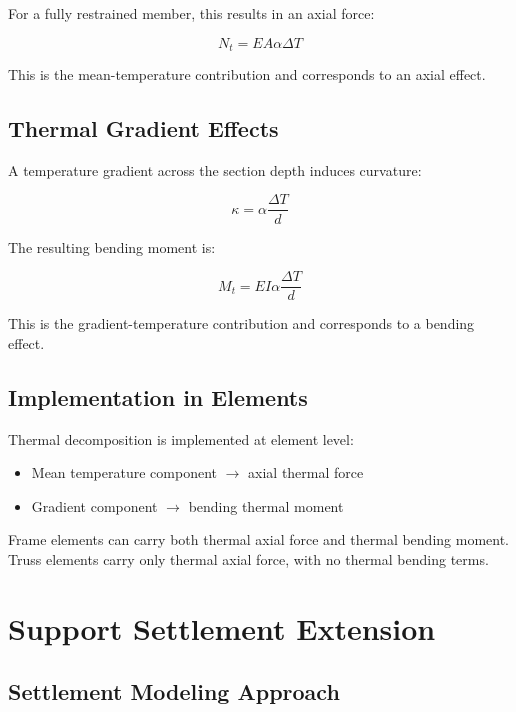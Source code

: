 For a fully restrained member, this results in an axial force:

\begin{equation}
N_t = E A \alpha \Delta T
\end{equation}

This is the mean-temperature contribution and corresponds to an axial effect.

\subsection{Thermal Gradient Effects}

A temperature gradient across the section depth induces curvature:

\begin{equation}
\kappa = \alpha \frac{\Delta T}{d}
\end{equation}

The resulting bending moment is:

\begin{equation}
M_t = E I \alpha \frac{\Delta T}{d}
\end{equation}

This is the gradient-temperature contribution and corresponds to a bending effect.

\subsection{Implementation in Elements}

Thermal decomposition is implemented at element level:

\begin{itemize}
    \item Mean temperature component $\rightarrow$ axial thermal force
    \item Gradient component $\rightarrow$ bending thermal moment
\end{itemize}

Frame elements can carry both thermal axial force and thermal bending moment. Truss elements carry only thermal axial force, with no thermal bending terms.

\pagebreak
\section{Support Settlement Extension}

\subsection{Settlement Modeling Approach}


